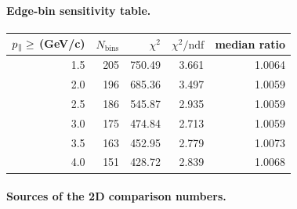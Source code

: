 \paragraph{Edge-bin sensitivity table.}
\begin{center}
\begin{tabular}{@{}rrrrr@{}}
\toprule
$p_{\parallel} \ge$ (GeV/c) & $N_{\text{bins}}$ & $\chi^{2}$ & $\chi^{2}/\mathrm{ndf}$ & median ratio \\
\midrule
1.5 & 205 & 750.49 & 3.661 & 1.0064 \\
2.0 & 196 & 685.36 & 3.497 & 1.0059 \\
2.5 & 186 & 545.87 & 2.935 & 1.0059 \\
3.0 & 175 & 474.84 & 2.713 & 1.0059 \\
3.5 & 163 & 452.95 & 2.779 & 1.0073 \\
4.0 & 151 & 428.72 & 2.839 & 1.0068 \\
\bottomrule
\end{tabular}
\end{center}

\paragraph{Sources of the 2D comparison numbers.}

